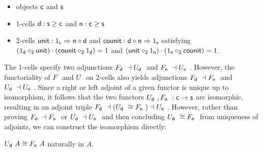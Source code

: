 \documentclass{drl-common/llncs}
\newcommand{\la}{\ensuremath{\dashv}}
\newcommand{\tc}[2]{\ensuremath{#1 \Rightarrow #2}}
\newcommand\compo[2]{\ensuremath{#1 \circ #2}}
\newcommand\compv[2]{\ensuremath{#1 \cdot #2}}
\newcommand\comph[2]{\ensuremath{#1 \mathbin{\circ_2} #2}}
\newcommand\F[2]{\ensuremath{F_{#1} \,\, #2}}
\newcommand\U[2]{\ensuremath{U_{#1} \,\, #2}}
\newcommand\iso{\cong}
\begin{document}
\begin{itemize}
\item objects $\mathsf{c}$ and $\mathsf{s}$
\item 1-cells $\mathsf{d} : \mathsf{s} \ge \mathsf{c}$ and $\mathsf{n} : \mathsf{c} \ge
  \mathsf{s}$
\item 2-cells $\dsd{unit} : \tc {1_{\dsd c}} {\compo{\dsd{n}} {\dsd{d}}}$ 
and $\dsd{counit} : \tc {\compo{\dsd{d}} {\dsd{n}}} {1_{\dsd s}}$ satisfying \\
$\compv{(\comph{1_{\dsd{d}}}{\dsd{unit}})}{(\comph{\dsd{counit}}{1_{\dsd d}})} = 1$
and 
$\compv{(\comph{\dsd{unit}}{1_{\dsd{n}}})}{(\comph{1_{\dsd n}}{\dsd{counit}})} = 1$.
\end{itemize}
\noindent
The 1-cells specify two adjunctions $\F{\dsd d}{} \la \U{\dsd d}{}$ and
$\F{\dsd n}{} \la \U{\dsd n}{}$.  However, the functoriality of $\F{}{}$
and $\U{}{}$ on 2-cells also yields adjunctions $\F{\dsd d}{} \la
\F{\dsd n}{}$ and $\U{\dsd d}{} \la \U{\dsd n}{}$.  Since a right or
left adjoint of a given functor is unique up to isomorphism, it follows
that the two functors $\U{\dsd d}{},\F{\dsd n}{} : \dsd c \to \dsd s$
are isomorphic, resulting in an adjoint triple $\F{\dsd d}{} \la (\U{\dsd
  d}{} \iso \F{\dsd{n}}{}) \la \U{\dsd{n}}{}$.  However, rather than
proving $\F{\dsd d}{} \la \F{\dsd n}{}$ or $\U{\dsd d}{} \la \U{\dsd
  n}{}$ and then concluding $\U{\dsd d}{} \iso \F{\dsd n}{}$ from
uniqueness of adjoints, we can construct the isomorphism directly:

\begin{lemma} \label{lem:mergeFU}
$\U{\dsd d}{A} \iso \F{\dsd n}{A}$ naturally in $A$.
\end{lemma}
\end{document}
